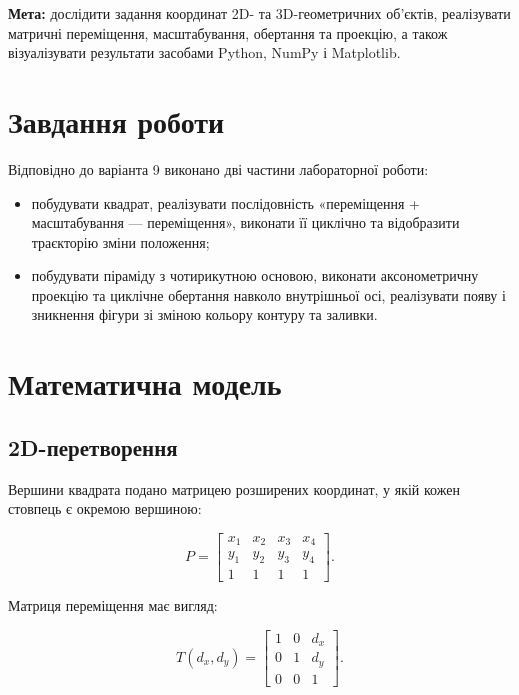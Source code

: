 \documentclass[12pt,a4paper]{article}
\begin{document}
\medskip

\noindent
\textbf{Мета:} дослідити задання координат 2D- та 3D-геометричних об’єктів, реалізувати матричні переміщення, масштабування, обертання та проекцію, а також візуалізувати результати засобами Python, NumPy і Matplotlib.

\section{Завдання роботи}

Відповідно до варіанта 9 виконано дві частини лабораторної роботи:

\begin{itemize}[leftmargin=*,itemsep=0.25em]
  \item побудувати квадрат, реалізувати послідовність «переміщення + масштабування --- переміщення», виконати її циклічно та відобразити траєкторію зміни положення;
  \item побудувати піраміду з чотирикутною основою, виконати аксонометричну проекцію та циклічне обертання навколо внутрішньої осі, реалізувати появу і зникнення фігури зі зміною кольору контуру та заливки.
\end{itemize}

\section{Математична модель}

\subsection{2D-перетворення}

Вершини квадрата подано матрицею розширених координат, у якій кожен стовпець є окремою вершиною:

\begin{equation}
P=\begin{bmatrix}x_1&x_2&x_3&x_4\\y_1&y_2&y_3&y_4\\1&1&1&1\end{bmatrix}.
\end{equation}

Матриця переміщення має вигляд:

\begin{equation}
T(d_x,d_y)=\begin{bmatrix}1&0&d_x\\0&1&d_y\\0&0&1\end{bmatrix}.
\end{equation}
\end{document}
